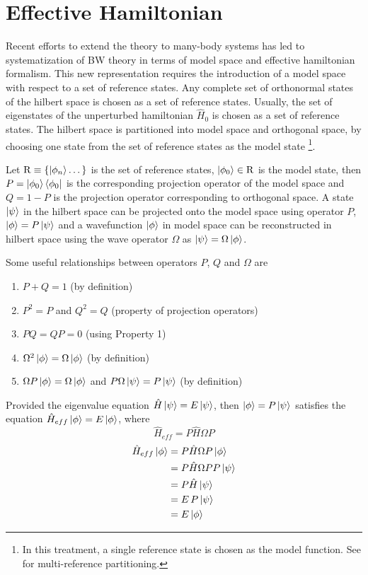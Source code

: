 \section{Effective Hamiltonian}
Recent efforts to extend the theory to many-body systems has led to systematization of BW theory in 
terms of model space and effective hamiltonian formalism. This new representation requires the
introduction of a model space with respect to a set of reference states. Any complete set of orthonormal states of the hilbert space 
is chosen as a set of reference states. Usually, the set of eigenstates of the unperturbed hamiltonian $\hat{H}_{0}$ is chosen as a set of 
reference states. The hilbert space is partitioned into model space and orthogonal space, by choosing one state from the set of
reference states as the model state \footnote{In this treatment, a single reference state is chosen as the model function. See 
\cite{wilson2009brillouin} for multi-reference partitioning.}.

Let $\mathrm{R}\equiv\{\ket{\phi_n}\dots\}$ is the set of reference states, $\ket{\phi_0} \in \mathrm{R}$ is the model state, 
then $P = \ket{\phi_0}\bra{\phi_0}$ is the corresponding projection operator of the model space and $Q = \mathrm{1} - P$ is the
projection operator corresponding to orthogonal space. A state $\ket{\psi}$ in the hilbert space can be projected onto the model 
space using operator $P$, $\ket{\phi} = P\ket{\psi}$ and a wavefunction $\ket{\phi}$ in model space can be reconstructed in hilbert
space using the wave operator $\Omega$ as $\ket{\psi} = \Omega\ket{\phi}$.

Some useful relationships between operators $P$, $Q$ and $\Omega$ are 
\begin{enumerate}
 \item $P + Q = \mathrm{1}$ (by definition)
 \item $P^2 = P$ and $Q^2 = Q$ (property of projection operators)
 \item $PQ = QP = 0$ (using Property 1)
 \item $\Omega^2\ket{\phi} = \Omega\ket{\phi}$ (by definition)
 \item $\Omega P \ket{\phi} = \Omega \ket{\phi}$ and $P\Omega \ket{\psi} = P \ket{\psi}$ (by definition)
\end{enumerate}

Provided the eigenvalue equation
$\hat{H}\ket{\psi} = E\ket{\psi}$, then $\ket{\phi} = P\ket{\psi}$ satisfies the equation 
$\hat{H}_{eff}\ket{\phi} = E\ket{\phi}$, where 
\begin{equation}
  \hat{H}_{eff} = P\hat{H}\Omega P
\end{equation}
\begin{align*}
 \hat{H}_{eff}\ket{\phi} &= P\hat{H}\Omega P \ket{\phi} \\
 &= P\hat{H}\Omega P P\ket{\psi} \\
 &= P\hat{H}\ket{\psi} \\
 &= E\,P\ket{\psi} \\
 &= E\ket{\phi}
\end{align*}

